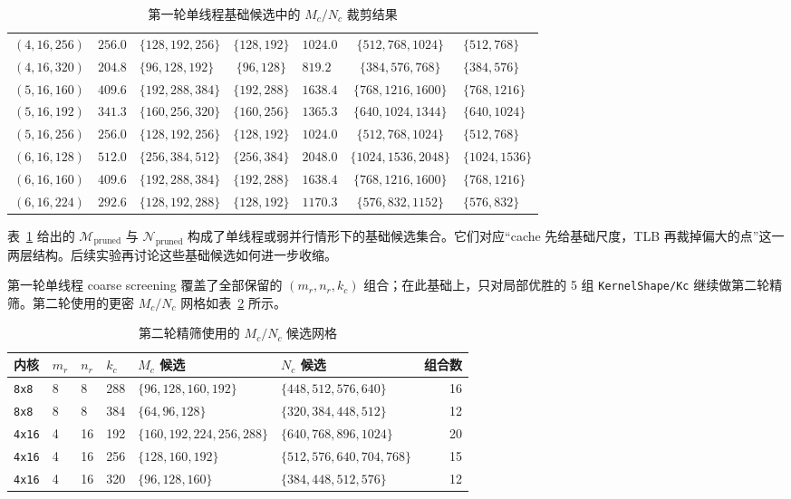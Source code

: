 \documentclass[a4paper,11pt,oneside]{article}
\begin{document}
\begin{table}[H]
\begin{tabular}{lclclcl}
$(4,16,256)$  & $256.0$ & $\{128,192,256\}$  & $\{128,192\}$  & $1024.0$ & $\{512,768,1024\}$    & $\{512,768\}$ \\
$(4,16,320)$  & $204.8$ & $\{96,128,192\}$   & $\{96,128\}$   & $819.2$  & $\{384,576,768\}$     & $\{384,576\}$ \\
$(5,16,160)$  & $409.6$ & $\{192,288,384\}$  & $\{192,288\}$  & $1638.4$ & $\{768,1216,1600\}$   & $\{768,1216\}$ \\
$(5,16,192)$  & $341.3$ & $\{160,256,320\}$  & $\{160,256\}$  & $1365.3$ & $\{640,1024,1344\}$   & $\{640,1024\}$ \\
$(5,16,256)$  & $256.0$ & $\{128,192,256\}$  & $\{128,192\}$  & $1024.0$ & $\{512,768,1024\}$    & $\{512,768\}$ \\
$(6,16,128)$  & $512.0$ & $\{256,384,512\}$  & $\{256,384\}$  & $2048.0$ & $\{1024,1536,2048\}$  & $\{1024,1536\}$ \\
$(6,16,160)$  & $409.6$ & $\{192,288,384\}$  & $\{192,288\}$  & $1638.4$ & $\{768,1216,1600\}$   & $\{768,1216\}$ \\
$(6,16,224)$  & $292.6$ & $\{128,192,288\}$  & $\{128,192\}$  & $1170.3$ & $\{576,832,1152\}$    & $\{576,832\}$ \\
\bottomrule
\end{tabular}
\caption{第一轮单线程基础候选中的 $M_c/N_c$ 裁剪结果}
\label{tab:appendix_round1_pruned}
\end{table}

表~\ref{tab:appendix_round1_pruned} 给出的 $\mathcal{M}_{\text{pruned}}$ 与 $\mathcal{N}_{\text{pruned}}$ 构成了单线程或弱并行情形下的基础候选集合。它们对应“cache 先给基础尺度，TLB 再裁掉偏大的点”这一两层结构。后续实验再讨论这些基础候选如何进一步收缩。

第一轮单线程 coarse screening 覆盖了全部保留的 $(m_r,n_r,k_c)$ 组合；在此基础上，只对局部优胜的 5 组 \texttt{KernelShape/Kc} 继续做第二轮精筛。第二轮使用的更密 $M_c/N_c$ 网格如表~\ref{tab:appendix_round2_grids} 所示。

\begin{table}[H]
\centering
\begin{tabular}{lll l p{} p{} r}
\toprule
\textbf{内核} & \textbf{$m_r$} & \textbf{$n_r$} & \textbf{$k_c$} & \textbf{$M_c$ 候选} & \textbf{$N_c$ 候选} & \textbf{组合数} \\
\midrule
\texttt{8x8}  & 8 & 8  & 288 & $\{96,128,160,192\}$ & $\{448,512,576,640\}$ & 16 \\
\texttt{8x8}  & 8 & 8  & 384 & $\{64,96,128\}$ & $\{320,384,448,512\}$ & 12 \\
\texttt{4x16} & 4 & 16 & 192 & $\{160,192,224,256,288\}$ & $\{640,768,896,1024\}$ & 20 \\
\texttt{4x16} & 4 & 16 & 256 & $\{128,160,192\}$ & $\{512,576,640,704,768\}$ & 15 \\
\texttt{4x16} & 4 & 16 & 320 & $\{96,128,160\}$ & $\{384,448,512,576\}$ & 12 \\
\bottomrule
\end{tabular}
\caption{第二轮精筛使用的 $M_c/N_c$ 候选网格}
\label{tab:appendix_round2_grids}
\end{table}
\end{document}
